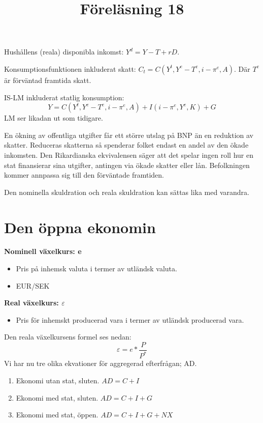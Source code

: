 \documentclass{article}
\begin{document}
Hushållens (reala) disponibla inkomst: $ Y^d = Y-T+rD $.  \par \noindent
Konsumptionsfunktionen inkluderat skatt: $  C_t = C(Y^t,Y^e-T^e,i-\pi^e, A) $. Där $ T^e $ är förväntad framtida skatt.

IS-LM inkluderat statlig konsumption: 
$$
Y = C(Y^t,Y^e-T^e,i-\pi^e, A) + I(i-\pi^e, Y^e,K) + G 
$$
LM ser likadan ut som tidigare. 
\vspace{5mm} \par \noindent 
En ökning av offentliga utgifter får ett större utslag på BNP än en reduktion av skatter. Reduceras skatterna så spenderar folket endast en andel av den ökade inkomsten. Den Rikardianska ekvivalensen säger att det spelar ingen roll hur en stat finansierar sina utgifter, antingen via ökade skatter eller lån. Befolkningen kommer annpassa sig till den förväntade framtiden. 

\vspace{5mm} \par \noindent 

Den nominella skuldration och reala skuldration kan sättas lika med varandra. 
\section{Den öppna ekonomin}
\vspace{5mm} \par \noindent 
\title{Föreläsning 18}
\vspace{5mm} \par \noindent 

\textbf{Nominell växelkurs: e}
\begin{itemize}
     \item Pris på inhemsk valuta i termer av utländsk valuta. 
     \item EUR/SEK
\end{itemize}
\vspace{5mm} \par \noindent 
\textbf{Real växelkurs: $ \varepsilon $}
\begin{itemize}
     \item Pris för inhemskt producerad vara i termer av utländsk producerad vara. 
\end{itemize}

Den reala växelkursens formel ses nedan: 
$$
\varepsilon = e * \frac{P}{P^*}
$$
Vi har nu tre olika ekvationer för aggregerad efterfrågan; AD. 
\begin{enumerate}
 \item Ekonomi utan stat, sluten. $ AD  = C + I $
 \item Ekonomi med stat, sluten. $ AD = C + I + G $
 \item Ekonomi med stat, öppen. $ AD = C + I + G + NX $ 
\end{enumerate}
\end{document}

